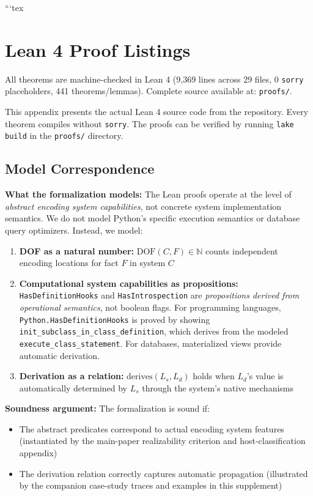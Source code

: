 ```tex
\section*{Lean 4 Proof Listings}\label{sec:lean}

All theorems are machine-checked in Lean 4 (9,369 lines across 29 files, 0 \texttt{sorry} placeholders, 441 theorems/lemmas). Complete source available at: \texttt{proofs/}.

This appendix presents the actual Lean 4 source code from the repository. Every theorem compiles without \texttt{sorry}. The proofs can be verified by running \texttt{lake build} in the \texttt{proofs/} directory.

\subsection*{Model Correspondence}\label{sec:model-correspondence}

\textbf{What the formalization models:} The Lean proofs operate at the level of \emph{abstract encoding system capabilities}, not concrete system implementation semantics. We do not model Python's specific execution semantics or database query optimizers. Instead, we model:

\begin{enumerate}
\item \textbf{DOF as a natural number:} $\text{DOF}(C, F) \in \mathbb{N}$ counts independent encoding locations for fact $F$ in system $C$
\item \textbf{Computational system capabilities as propositions:} \texttt{HasDefinitionHooks} and \texttt{HasIntrospection} are \emph{propositions derived from operational semantics}, not boolean flags. For programming languages, \texttt{Python.HasDefinitionHooks} is proved by showing \texttt{init\_subclass\_in\_class\_definition}, which derives from the modeled \texttt{execute\_class\_statement}. For databases, materialized views provide automatic derivation.
\item \textbf{Derivation as a relation:} $\text{derives}(L_s, L_d)$ holds when $L_d$'s value is automatically determined by $L_s$ through the system's native mechanisms
\end{enumerate}

\textbf{Soundness argument:} The formalization is sound if:
\begin{itemize}
\item The abstract predicates correspond to actual encoding system features (instantiated by the main-paper realizability criterion and host-classification appendix)
\item The derivation relation correctly captures automatic propagation (illustrated by the companion case-study traces and examples in this supplement)
\end{itemize}

